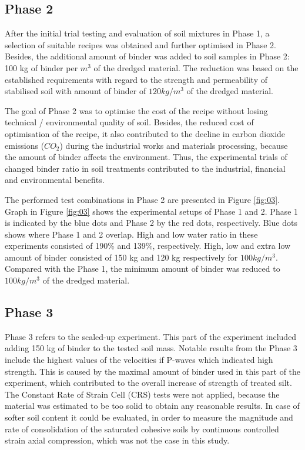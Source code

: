 \documentclass{amestyle}
\begin{document}
\subsection{Phase 2}

After the initial trial testing and evaluation of soil mixtures in Phase 1, a selection of suitable recipes was obtained and further optimised in Phase 2. Besides, the additional amount of binder was added to soil samples in Phase 2: 100 kg of binder per $m^3$ of the dredged material. The reduction was based on the established requirements with regard to the strength and permeability of stabilised soil with amount of binder of $120 kg/m^3$ of the dredged material. 

The goal of Phase 2 was to optimise the cost of the recipe without losing technical / environmental quality of soil. Besides, the reduced cost of optimisation of the recipe, it also contributed to the decline in carbon dioxide emissions ($CO_2$) during the industrial works and materials processing, because the amount of binder affects the environment. Thus, the experimental trials of changed binder ratio in soil treatments contributed to the industrial, financial and environmental benefits.

The performed test combinations in Phase 2 are presented in Figure \ref{fig:03}. Graph in Figure \ref{fig:03} shows the experimental setups of Phase 1 and 2. Phase 1 is indicated by the blue dots and Phase 2 by the red dots, respectively. Blue dots shows where Phase 1 and 2 overlap. High and low water ratio in these experiments consisted of 190\% and 139\%, respectively. High, low and extra low amount of binder consisted of 150 kg and 120 kg respectively for $100 kg/m^3$. Compared with the Phase 1, the minimum amount of binder was reduced to $100 kg/m^3$ of the dredged material. 

\subsection{Phase 3}

Phase 3 refers to the scaled-up experiment. This part of the experiment included adding 150 kg of binder to the tested soil mass. Notable results from the Phase 3 include the highest values of the velocities if P-waves which indicated high strength. This is caused by the maximal amount of binder used in this part of the experiment, which contributed to the overall increase of strength of treated silt. The Constant Rate of Strain Cell (CRS) tests were not applied, because the material was estimated to be too solid to obtain any reasonable results. In case of softer soil content it could be evaluated, in order to measure the magnitude and rate of consolidation of the saturated cohesive soils by continuous controlled strain axial compression, which was not the case in this study. 
\end{document}
